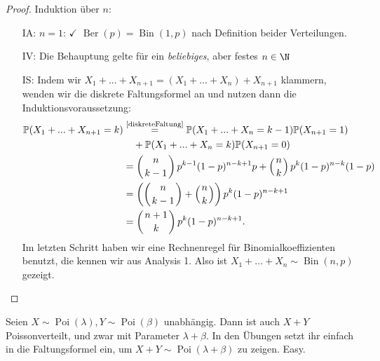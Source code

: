 \begin{proof}
	Induktion über $n$:
	\begin{itemize}
		\item[IA:] $n=1$: $\checkmark$ $\operatorname{Ber}(p) = \operatorname{Bin}(1,p)$ nach Definition beider Verteilungen.
		\item[IV:] Die Behauptung gelte für ein \textit{beliebiges}, aber festes $n \in \N$
		\item[IS:] Indem wir $X_1+...+X_{n+1}=(X_1+...+X_n)+X_{n+1}$ klammern, wenden wir die diskrete Faltungsformel an und nutzen dann die Induktionsvoraussetzung:
		 \begin{align*}
			\mathbb{P}(X_1+...+X_{n+1} = k)&
			\overset{\text{\ref{diskreteFaltung}}}{=} \mathbb{P}(X_1+...+X_{n} = k-1) \mathbb{P}(X_{n+1} = 1)\\
			&\quad + \mathbb{P}(X_1+...+X_{n} = k) \mathbb{P}(X_{n+1} = 0)\\
			&= \left(  n\atop{k-1}\right) p^{k-1} (1-p)^{n-k+1}p + \left( n\atop k\right) p^{k} (1-p)^{n-k}(1-p) \\
			&= \left(\left( n\atop {k-1} \right) + \left( n\atop  k\right)\right) p^k (1-p)^{n-k+1}\\
			& = \left({n + 1}\atop  k \right) p^k (1-p)^{n-k+1}.
		\end{align*}
		Im letzten Schritt haben wir eine Rechnenregel f\"ur Binomialkoeffizienten benutzt, die kennen wir aus Analysis 1. Also ist $X_1+...+X_n \sim \operatorname{Bin}(n,p)$ gezeigt. 
	\end{itemize} 
\end{proof}
\begin{beispiel}
	Seien $X \sim \operatorname{Poi}(\lambda), Y \sim \operatorname{Poi}(\beta)$ unabhängig. Dann ist auch $X+Y$ Poissonverteilt, und zwar mit Parameter $\lambda+\beta$. In den \"Ubungen setzt ihr einfach in die Faltungsformel ein, um $X+Y\sim \operatorname{Poi}(\lambda+\beta)$ zu zeigen. Easy.
\end{beispiel}

